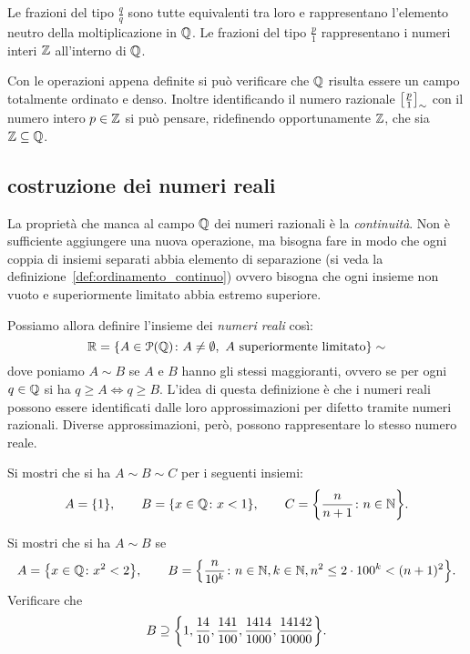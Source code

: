 Le frazioni del tipo $\frac{q}{q}$ sono tutte equivalenti tra loro e rappresentano 
l'elemento neutro della moltiplicazione in ${\mathbb Q}$.
Le frazioni del tipo $\frac{p}{1}$ rappresentano 
i numeri interi ${\mathbb Z}$ all'interno di ${\mathbb Q}$.

Con le operazioni appena definite si può verificare che ${\mathbb Q}$ 
risulta essere un campo totalmente ordinato e denso.
Inoltre identificando il numero razionale ${\left[ \frac p 1 \right]}_\sim$
con il numero intero $p\in {\mathbb Z}$ si può pensare, ridefinendo opportunamente 
${\mathbb Z}$, che sia ${\mathbb Z} \subseteq {\mathbb Q}$.

\subsection{costruzione dei numeri reali}
\label{sec:costruzione_reali}

La proprietà che manca al campo ${\mathbb Q}$ dei numeri razionali 
è la \emph{continuità}. 
Non è sufficiente aggiungere una nuova operazione, ma bisogna 
fare in modo che ogni coppia di insiemi separati 
abbia elemento di separazione 
(si veda la definizione~\ref{def:ordinamento_continuo})
ovvero bisogna che ogni insieme non vuoto e superiormente 
limitato abbia estremo superiore.

Possiamo allora definire l'insieme dei \emph{numeri reali}
così:
%
%
%
\[
{\mathbb R} = {\left\{ A \in \mathcal P({\mathbb Q})\colon A\neq \emptyset, \text{ $A$ superiormente 
limitato} \right\}}\sim
\]
dove poniamo $A\sim B$ 
se $A$ e $B$ hanno gli stessi maggioranti, ovvero
se per ogni $q\in {\mathbb Q}$ si ha $q\ge A \iff q\ge B$.
L'idea di questa definizione è che i numeri reali 
possono essere identificati dalle loro approssimazioni 
per difetto tramite numeri razionali. 
Diverse approssimazioni, però, possono rappresentare 
lo stesso numero reale.

\begin{exercise}
  Si mostri che si ha $A \sim B \sim C$
  per i seguenti insiemi:
  \[
  A = {\left\{ 1 \right\}}, \qquad 
  B = {\left\{ x\in {\mathbb Q}\colon x<1 \right\}}, \qquad
  C = {\left\{ \frac{n}{n+1}\colon n\in {\mathbb N} \right\}}.
  \]
\end{exercise}

\begin{exercise}
  Si mostri che si ha $A\sim B$ se
  \[
  A = {\left\{ x\in {\mathbb Q}\colon x^2<2 \right\}}, \qquad
  B = {\left\{ \frac{n}{10^k}\colon n\in {\mathbb N}, k\in {\mathbb N}, n^2 \le 2\cdot 100^k < (n+1)^2 \right\}}.  
  \]
  Verificare che 
  \[
    B \supseteq {\left\{ 
      1,\frac{14}{10},\frac{141}{100},\frac{1414}{1000},
      \frac{14142}{10000} \right\}}.
  \]
\end{exercise}

